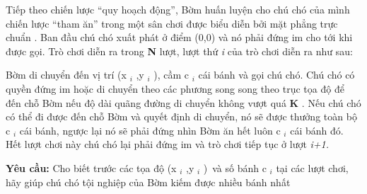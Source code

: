 Tiếp theo chiến lược “quy hoạch động”, Bờm huấn luyện cho chú chó của mình chiến lược “tham ăn” trong một sân chơi được biểu diễn bởi mặt phẳng trực chuẩn                                                   . Ban đầu chú chó xuất phát ở điểm (0,0) và nó phải đứng im cho tới khi được gọi. Trò chơi diễn ra trong   \textbf{    N   }   lượt, lượt thứ   \emph{    i   }   của trò chơi diễn ra như sau:  

   Bờm di chuyển đến vị trí (x   $_    i   $   ,y   $_    i   $   ), cầm c   $_    i   $   cái bánh và gọi chú chó. Chú chó có quyền đứng im hoặc di chuyển theo các phương song song theo trục tọa độ để đến chỗ Bờm nếu độ dài quãng đường di chuyển không vượt quá   \textbf{    K   }   . Nếu chú chó có thể đi được đến chỗ Bờm và quyết định di chuyển, nó sẽ được thưởng toàn bộ c   $_    i   $   cái bánh, ngược lại nó sẽ phải đứng nhìn Bờm ăn hết luôn c   $_    i   $   cái bánh đó. Hết lượt chơi này chú chó lại phải đứng im và trò chơi tiếp tục ở lượt   \emph{    i+1.   }

\textbf{    Yêu cầu:   }   Cho biết trước các tọa độ (x   $_    i   $   ,y   $_    i   $   ) và số bánh c   $_    i   $   tại các lượt chơi, hãy giúp chú chó tội nghiệp của Bờm kiếm được nhiều bánh nhất  

\
